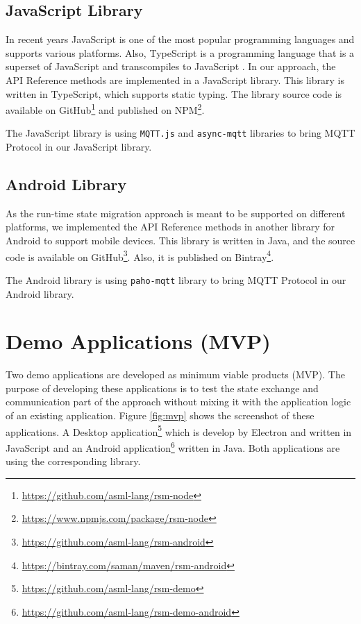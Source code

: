 \subsection{JavaScript Library}
In recent years JavaScript is one of the most popular programming languages and supports various platforms. Also, TypeScript is a programming language that is a superset of JavaScript and transcompiles to JavaScript  \cite{typescript}. In our approach, the API Reference methods are implemented in a JavaScript library. This library is written in TypeScript, which supports static typing. The library source code is available on GitHub\footnote{\url{https://github.com/asml-lang/rsm-node}} and published on NPM\footnote{\url{https://www.npmjs.com/package/rsm-node}}.

The JavaScript library is using \lstinline[basicstyle=\ttfamily]{MQTT.js} and \lstinline[basicstyle=\ttfamily]{async-mqtt} libraries to bring MQTT Protocol in our JavaScript library.


\subsection{Android Library}
As the run-time state migration approach is meant to be supported on different platforms, we implemented the API Reference methods in another library for Android to support mobile devices. This library is written in Java, and
the source code is available on GitHub\footnote{\url{https://github.com/asml-lang/rsm-android}}. Also, it is published on Bintray\footnote{\url{https://bintray.com/saman/maven/rsm-android}}.

The Android library is using \lstinline[basicstyle=\ttfamily]{paho-mqtt} library to bring MQTT Protocol in our Android library.

\section{Demo Applications (MVP)}
Two demo applications are developed as minimum viable products (MVP). The purpose of developing these applications is to test the state exchange and communication part of the approach without mixing it with the application logic of an existing application. Figure \ref{fig:mvp} shows the screenshot of these applications. A Desktop application\footnote{\url{https://github.com/asml-lang/rsm-demo}} which is develop by Electron and written in JavaScript and an Android application\footnote{\url{https://github.com/asml-lang/rsm-demo-android}} written in Java. Both applications are using the corresponding library.

